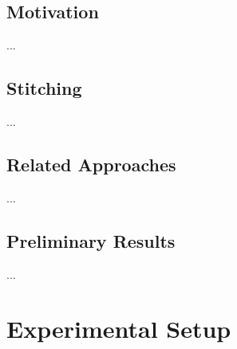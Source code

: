 \documentclass{article} %
\begin{document}
\subsection{Motivation}
...

\subsection{Stitching}
...

\subsection{Related Approaches}
...

\subsection{Preliminary Results}
...

% 
% 
\section{Experimental Setup}
\end{document}

